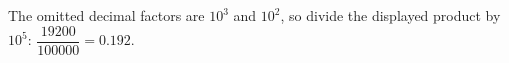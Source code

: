 The omitted decimal factors are $10^3$ and $10^2$, so divide the displayed product by $10^5$: $\dfrac{19200}{100000}=\boxed{0.192}$.
